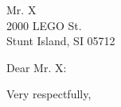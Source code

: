 \documentclass{letter}
\begin{document}
\begin{letter}{
Mr. X \\
2000 LEGO St. \\
Stunt Island, SI 05712
}

\opening{Dear Mr. X:}





\closing{Very respectfully,}

\end{letter}
\end{document}
